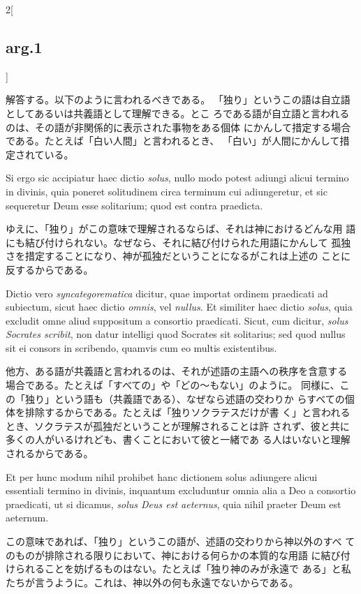 \documentclass[paper=a4paper,fontsize=10pt,jafontsize=9pt,titlepage]{jlreq}
\begin{document}
\begin{paracol}{2}[\subsection{arg.1}]
\switchcolumn

解答する。以下のように言われるべきである。
「独り」というこの語は自立語としてあるいは共義語として理解できる。とこ
 ろである語が自立語と言われるのは、その語が非関係的に表示された事物をある個体
 にかんして措定する場合である。たとえば「白い人間」と言われるとき、
 「白い」が人間にかんして措定されている。

\switchcolumn*

Si ergo
 sic accipiatur haec dictio {\itshape solus}, nullo modo potest adiungi alicui
 termino in divinis, quia poneret solitudinem circa terminum cui
 adiungeretur, et sic sequeretur Deum esse solitarium; quod est contra
 praedicta.

\switchcolumn

ゆえに、「独り」がこの意味で理解されるならば、それは神におけるどんな用
 語にも結び付けられない。なぜなら、それに結び付けられた用語にかんして
 孤独さを措定することになり、神が孤独だということになるがこれは上述の
 ことに反するからである。

\switchcolumn*

Dictio vero {\itshape syncategorematica} dicitur, quae importat
 ordinem praedicati ad subiectum, sicut haec dictio {\itshape omnis}, vel
 {\itshape nullus}. 
Et similiter haec dictio {\itshape solus}, quia excludit omne aliud
 suppositum a consortio praedicati. Sicut, cum dicitur, {\itshape solus Socrates
 scribit}, non datur intelligi quod Socrates sit solitarius; sed quod
 nullus sit ei consors in scribendo, quamvis cum eo multis
 existentibus.

\switchcolumn

他方、ある語が共義語と言われるのは、それが述語の主語への秩序を含意する
 場合である。たとえば「すべての」や「どの〜もない」のように。
同様に、この「独り」という語も（共義語である）、なぜなら述語の交わりか
 らすべての個体を排除するからである。たとえば「独りソクラテスだけが書
 く」と言われるとき、ソクラテスが孤独だということが理解されることは許
 されず、彼と共に多くの人がいるけれども、書くことにおいて彼と一緒であ
 る人はいないと理解されるからである。

\switchcolumn*

Et per hunc modum nihil prohibet hanc dictionem solus
 adiungere alicui essentiali termino in divinis, inquantum excluduntur
 omnia alia a Deo a consortio praedicati, ut si dicamus, {\itshape solus Deus
 est aeternus}, quia nihil praeter Deum est aeternum.

\switchcolumn

この意味であれば、「独り」というこの語が、述語の交わりから神以外のすべ
 てのものが排除される限りにおいて、神における何らかの本質的な用語
 に結び付けられることを妨げるものはない。たとえば「独り神のみが永遠で
 ある」と私たちが言うように。これは、神以外の何も永遠でないからである。


\end{paracol}
\end{document}
